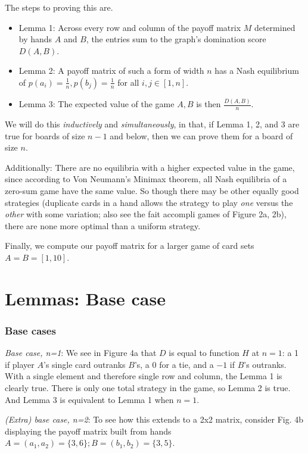 \documentclass[11pt, oneside]{article} 	%
\begin{document}
The steps to proving this are.

\begin{itemize}
\item Lemma 1: Across every row and column of the payoff matrix $M$ determined by hands $A$ and $B$, the entries sum to the graph's domination score $D(A,B)$.
\item Lemma 2: A payoff matrix of such a form of width $n$ has a Nash equilibrium\cite{2} of $p(a_i) = \frac{1}{n}, p(b_j) = \frac{1}{n}$ for all $i, j \in [1,n]$.
\item Lemma 3: The expected value of the game $A, B$ is then $\frac{D(A,B)}{n}$.
\end{itemize}

We will do this \emph{inductively} and \emph{simultaneously}, in that, if Lemma 1, 2, and 3 are true for boards of size $n-1$ and below, then we can prove them for a board of size $n$.

Additionally: There are no equilibria with a higher expected value in the game, since according to Von Neumann's Minimax theorem\cite{3}, all Nash equilibria of a zero-sum game have the same value. So though there may be other equally good strategies (duplicate cards in a hand allows the strategy to play \emph{one} versus the \emph{other} with some variation; also see the fait accompli games of Figure 2a, 2b), there are none more optimal than a uniform strategy.


Finally, we compute our payoff matrix for a larger game of card sets $A = B = [1,10]$.

\section{Lemmas: Base case}



\subsubsection{Base cases} 
\emph{Base case, n=1}: We see in Figure 4a that $D$ is equal to function $H$ at $n=1$: a 1 if player $A$'s single card outranks $B$'s, a 0 for a tie, and a $-1$ if $B$'s outranks. With a single element and therefore single row and column, the Lemma 1 is clearly true. There is only one total strategy in the game, so Lemma 2 is true. And Lemma 3 is equivalent to Lemma 1 when $n=1$.

\emph{(Extra) base case, n=2}: To see how this extends to a 2x2 matrix, consider Fig. 4b displaying the payoff matrix built from hands $A = (a_1, a_2) = \{3, 6\}; B = (b_1,b_2) = \{3,5\}$.
\end{document}
